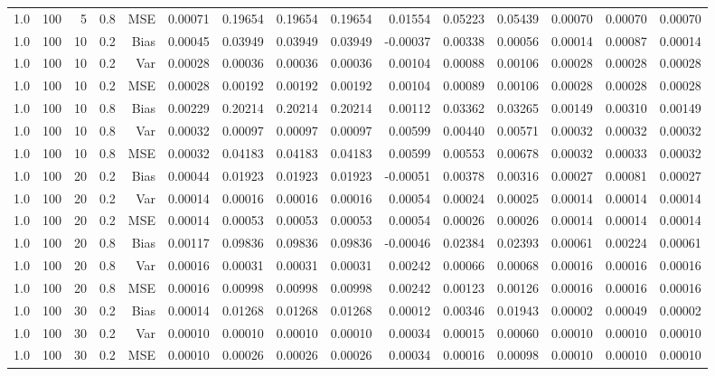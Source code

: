 \begin{table}[!htbp]
\begin{tabular}{lrrrrrrrrrrrrrr}
1.0 & 100 &  5 & 0.8 & MSE & 0.00071 & 0.19654 & 0.19654 & 0.19654 & 0.01554 & 0.05223 & 0.05439 & 0.00070 & 0.00070 & 0.00070 \\
1.0 & 100 & 10 & 0.2 & Bias & 0.00045 & 0.03949 & 0.03949 & 0.03949 & -0.00037 & 0.00338 & 0.00056 & 0.00014 & 0.00087 & 0.00014 \\
1.0 & 100 & 10 & 0.2 & Var & 0.00028 & 0.00036 & 0.00036 & 0.00036 & 0.00104 & 0.00088 & 0.00106 & 0.00028 & 0.00028 & 0.00028 \\
1.0 & 100 & 10 & 0.2 & MSE & 0.00028 & 0.00192 & 0.00192 & 0.00192 & 0.00104 & 0.00089 & 0.00106 & 0.00028 & 0.00028 & 0.00028 \\
1.0 & 100 & 10 & 0.8 & Bias & 0.00229 & 0.20214 & 0.20214 & 0.20214 & 0.00112 & 0.03362 & 0.03265 & 0.00149 & 0.00310 & 0.00149 \\
1.0 & 100 & 10 & 0.8 & Var & 0.00032 & 0.00097 & 0.00097 & 0.00097 & 0.00599 & 0.00440 & 0.00571 & 0.00032 & 0.00032 & 0.00032 \\
1.0 & 100 & 10 & 0.8 & MSE & 0.00032 & 0.04183 & 0.04183 & 0.04183 & 0.00599 & 0.00553 & 0.00678 & 0.00032 & 0.00033 & 0.00032 \\
1.0 & 100 & 20 & 0.2 & Bias & 0.00044 & 0.01923 & 0.01923 & 0.01923 & -0.00051 & 0.00378 & 0.00316 & 0.00027 & 0.00081 & 0.00027 \\
1.0 & 100 & 20 & 0.2 & Var & 0.00014 & 0.00016 & 0.00016 & 0.00016 & 0.00054 & 0.00024 & 0.00025 & 0.00014 & 0.00014 & 0.00014 \\
1.0 & 100 & 20 & 0.2 & MSE & 0.00014 & 0.00053 & 0.00053 & 0.00053 & 0.00054 & 0.00026 & 0.00026 & 0.00014 & 0.00014 & 0.00014 \\
1.0 & 100 & 20 & 0.8 & Bias & 0.00117 & 0.09836 & 0.09836 & 0.09836 & -0.00046 & 0.02384 & 0.02393 & 0.00061 & 0.00224 & 0.00061 \\
1.0 & 100 & 20 & 0.8 & Var & 0.00016 & 0.00031 & 0.00031 & 0.00031 & 0.00242 & 0.00066 & 0.00068 & 0.00016 & 0.00016 & 0.00016 \\
1.0 & 100 & 20 & 0.8 & MSE & 0.00016 & 0.00998 & 0.00998 & 0.00998 & 0.00242 & 0.00123 & 0.00126 & 0.00016 & 0.00016 & 0.00016 \\
1.0 & 100 & 30 & 0.2 & Bias & 0.00014 & 0.01268 & 0.01268 & 0.01268 & 0.00012 & 0.00346 & 0.01943 & 0.00002 & 0.00049 & 0.00002 \\
1.0 & 100 & 30 & 0.2 & Var & 0.00010 & 0.00010 & 0.00010 & 0.00010 & 0.00034 & 0.00015 & 0.00060 & 0.00010 & 0.00010 & 0.00010 \\
1.0 & 100 & 30 & 0.2 & MSE & 0.00010 & 0.00026 & 0.00026 & 0.00026 & 0.00034 & 0.00016 & 0.00098 & 0.00010 & 0.00010 & 0.00010 \\

\end{tabular}
\end{table}
